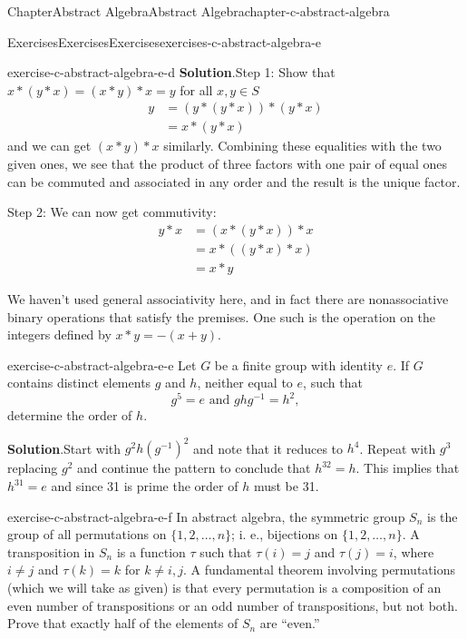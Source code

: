 \documentclass[oneside,10pt,]{book}
\newcommand{\blocktitlefont}{\relax}
\numberwithin{equation}{section}
\begin{document}
\begin{chapterptx}{Chapter}{Abstract Algebra}{}{Abstract Algebra}{}{}{chapter-c-abstract-algebra}
\begin{exercises-section}{Exercises}{Exercises}{}{Exercises}{}{}{exercises-c-abstract-algebra-e}
\begin{divisionexercise}{3}{}{}{exercise-c-abstract-algebra-e-d}
\noindent\textbf{\blocktitlefont Solution}.\hypertarget{solution-c-abstract-algebra-e-d-b}{}\quad{}Step 1: Show that \(x*(y*x)=(x*y)*x = y\) for all \(x,y \in S\)%
\begin{equation*}
\begin{split}
y &=(y*(y*x))*(y*x)\\
&=x*(y*x)
\end{split}
\end{equation*}
and we can get \((x*y)*x\)	similarly.  Combining these equalities with the two given ones, we see that the product of three factors with one pair of equal ones can be commuted and associated in any order and the result is the unique factor.%
\par
Step 2: We can now get commutivity:%
\begin{equation*}
\begin{split}
y*x &= (x*(y*x))*x\\
&=x*((y*x)*x)\\
&=x*y
\end{split}
\end{equation*}
%
\par
We haven't used general associativity here, and in fact there are nonassociative binary operations that satisfy the premises. One such is the operation on the integers defined by \(x*y = -(x+y)\).%
\end{divisionexercise}%
\begin{divisionexercise}{4}{}{}{exercise-c-abstract-algebra-e-e}%
Let \(G\) be a finite group with identity \(e\).  If \(G\) contains distinct elements \(g\) and \(h\), neither equal to \(e\), such that%
\begin{equation*}
g^5=e \textrm{  and  }g h g^{-1} = h^2,
\end{equation*}
determine the order of \(h\).%
\par\smallskip%
\noindent\textbf{\blocktitlefont Solution}.\hypertarget{solution-c-abstract-algebra-e-e-b}{}\quad{}Start with \(g^2 h (g^{-1})^{2}\) and note that it reduces to \(h^4\).  Repeat with \(g^3\) replacing \(g^2\) and continue the pattern to conclude that \(h^{32}=h\).  This implies that \(h^{31}=e\) and since 31 is prime the order of \(h\) must be 31.%
\end{divisionexercise}%
\begin{divisionexercise}{5}{}{}{exercise-c-abstract-algebra-e-f}%
%
In abstract algebra, the symmetric group \(S_n\) is the group of all permutations on \(\{1, 2, \dots, n\}\); i. e., bijections on \(\{1, 2, \dots, n\}\).  A transposition in \(S_n\) is a function \(\tau\) such that \(\tau(i)=j\) and \(\tau(j)=i\), where \(i \neq j\) and \(\tau(k)=k\) for \(k \neq i, j\).  A fundamental theorem involving permutations (which we will take as given) is that every permutation is a composition of an even number of transpositions or  an odd number of transpositions, but not both.   Prove that exactly half of the elements of \(S_n\) are ``even.''%

\end{divisionexercise}
\end{exercises-section}
\end{chapterptx}
\end{document}
